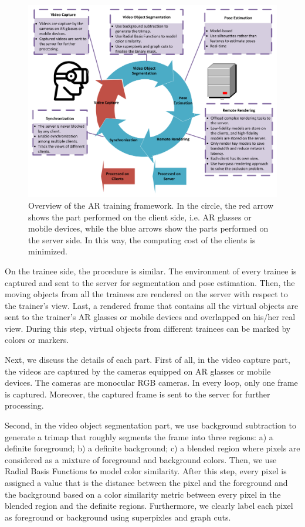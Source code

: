 \begin{figure}[!htbp]
	\centering
	\includegraphics[width=\textwidth]{figures/AR-training-overview.pdf}
	\caption{Overview of the AR training framework. In the circle, the red arrow shows the part performed on the client side, i.e. AR glasses or mobile devices, while the blue arrows show the parts performed on the server side. In this way, the computing cost of the clients is minimized.}
	\label{fig:ar-training-overview}
\end{figure}

On the trainee side, the procedure is similar.
The environment of every trainee is captured and sent to the server for segmentation and pose estimation.
Then, the moving objects from all the trainees are rendered on the server with respect to the trainer's view.
Last, a rendered frame that contains all the virtual objects are sent to the trainer's AR glasses or mobile devices and overlapped on his/her real view. During this step, virtual objects from different trainees can be marked by colors or markers.

Next, we discuss the details of each part.
First of all, in the video capture part, the videos are captured by the cameras equipped on AR glasses or mobile devices.
The cameras are monocular RGB cameras. In every loop, only one frame is captured.
Moreover, the captured frame is sent to the server for further processing.

Second, in the video object segmentation part, we use background subtraction to generate a trimap that  roughly segments the frame into three regions: a) a definite foreground; b) a definite background; c) a blended region where pixels are considered as a mixture of foreground and background colors.
Then, we use Radial Basis Functions to model color similarity. After this step, every pixel is assigned a value that is the distance between the pixel and the foreground and the background based on a color similarity metric between every pixel in the blended region and the definite regions.
Furthermore, we clearly label each pixel as foreground or background using superpixles and graph cuts.


